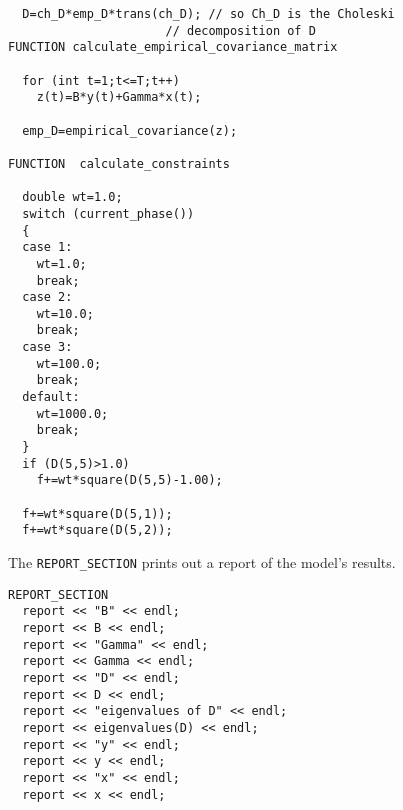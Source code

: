 \begin{lstlisting}
  D=ch_D*emp_D*trans(ch_D); // so Ch_D is the Choleski
                      // decomposition of D
FUNCTION calculate_empirical_covariance_matrix

  for (int t=1;t<=T;t++)
    z(t)=B*y(t)+Gamma*x(t);

  emp_D=empirical_covariance(z);
  
FUNCTION  calculate_constraints

  double wt=1.0;
  switch (current_phase())
  {
  case 1:
    wt=1.0;
    break;
  case 2:
    wt=10.0;
    break;
  case 3:
    wt=100.0;
    break;
  default:
    wt=1000.0;
    break;
  }
  if (D(5,5)>1.0)
    f+=wt*square(D(5,5)-1.00);

  f+=wt*square(D(5,1));
  f+=wt*square(D(5,2));
\end{lstlisting}

The \texttt{REPORT\_SECTION} prints out a report of the model's results.

\begin{lstlisting}
REPORT_SECTION
  report << "B" << endl;
  report << B << endl;
  report << "Gamma" << endl;
  report << Gamma << endl;
  report << "D" << endl;
  report << D << endl;
  report << "eigenvalues of D" << endl;
  report << eigenvalues(D) << endl;
  report << "y" << endl;
  report << y << endl;
  report << "x" << endl;
  report << x << endl;
\end{lstlisting}

